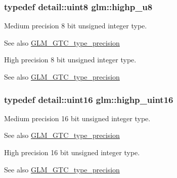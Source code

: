 \subsubsection[{highp\+\_\+u8}]{\setlength{\rightskip}{0pt plus 5cm}typedef {\bf detail\+::uint8} {\bf glm\+::highp\+\_\+u8}}\label{group__gtc__type__precision_ga8a60abe782749c504fb5ae51eb8b49cc}
Medium precision 8 bit unsigned integer type. \begin{DoxySeeAlso}{See also}
\hyperlink{group__gtc__type__precision}{G\+L\+M\+\_\+\+G\+T\+C\+\_\+type\+\_\+precision}
\end{DoxySeeAlso}
High precision 8 bit unsigned integer type. \begin{DoxySeeAlso}{See also}
\hyperlink{group__gtc__type__precision}{G\+L\+M\+\_\+\+G\+T\+C\+\_\+type\+\_\+precision} 
\end{DoxySeeAlso}
\hypertarget{group__gtc__type__precision_ga4d32967d45ba8365e2a05eaaac85e978}{}
\subsubsection[{highp\+\_\+uint16}]{\setlength{\rightskip}{0pt plus 5cm}typedef {\bf detail\+::uint16} {\bf glm\+::highp\+\_\+uint16}}\label{group__gtc__type__precision_ga4d32967d45ba8365e2a05eaaac85e978}
Medium precision 16 bit unsigned integer type. \begin{DoxySeeAlso}{See also}
\hyperlink{group__gtc__type__precision}{G\+L\+M\+\_\+\+G\+T\+C\+\_\+type\+\_\+precision}
\end{DoxySeeAlso}
High precision 16 bit unsigned integer type. \begin{DoxySeeAlso}{See also}
\hyperlink{group__gtc__type__precision}{G\+L\+M\+\_\+\+G\+T\+C\+\_\+type\+\_\+precision} 
\end{DoxySeeAlso}
\hypertarget{group__gtc__type__precision_ga3145bc0ee80432c165e985a188a722b3}{}
